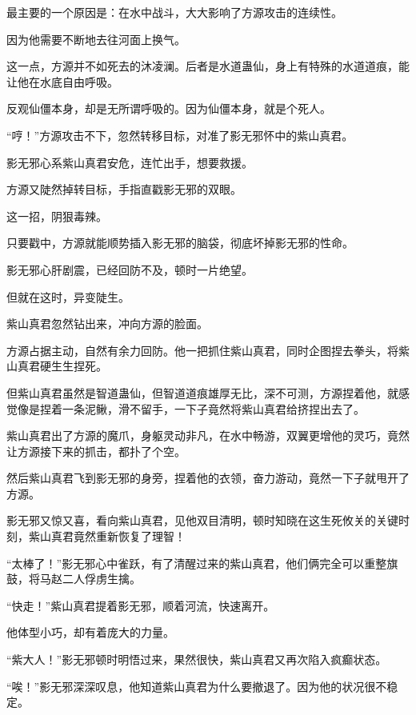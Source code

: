 
\begin{this_body}



最主要的一个原因是：在水中战斗，大大影响了方源攻击的连续性。

因为他需要不断地去往河面上换气。

这一点，方源并不如死去的沐凌澜。后者是水道蛊仙，身上有特殊的水道道痕，能让他在水底自由呼吸。

反观仙僵本身，却是无所谓呼吸的。因为仙僵本身，就是个死人。

“哼！”方源攻击不下，忽然转移目标，对准了影无邪怀中的紫山真君。

影无邪心系紫山真君安危，连忙出手，想要救援。

方源又陡然掉转目标，手指直戳影无邪的双眼。

这一招，阴狠毒辣。

只要戳中，方源就能顺势插入影无邪的脑袋，彻底坏掉影无邪的性命。

影无邪心肝剧震，已经回防不及，顿时一片绝望。

但就在这时，异变陡生。

紫山真君忽然钻出来，冲向方源的脸面。

方源占据主动，自然有余力回防。他一把抓住紫山真君，同时企图捏去拳头，将紫山真君硬生生捏死。

但紫山真君虽然是智道蛊仙，但智道道痕雄厚无比，深不可测，方源捏着他，就感觉像是捏着一条泥鳅，滑不留手，一下子竟然将紫山真君给挤捏出去了。

紫山真君出了方源的魔爪，身躯灵动非凡，在水中畅游，双翼更增他的灵巧，竟然让方源接下来的抓击，都扑了个空。

然后紫山真君飞到影无邪的身旁，捏着他的衣领，奋力游动，竟然一下子就甩开了方源。

影无邪又惊又喜，看向紫山真君，见他双目清明，顿时知晓在这生死攸关的关键时刻，紫山真君竟然重新恢复了理智！

“太棒了！”影无邪心中雀跃，有了清醒过来的紫山真君，他们俩完全可以重整旗鼓，将马赵二人俘虏生擒。

“快走！”紫山真君提着影无邪，顺着河流，快速离开。

他体型小巧，却有着庞大的力量。

“紫大人！”影无邪顿时明悟过来，果然很快，紫山真君又再次陷入疯癫状态。

“唉！”影无邪深深叹息，他知道紫山真君为什么要撤退了。因为他的状况很不稳定。


\end{this_body}

